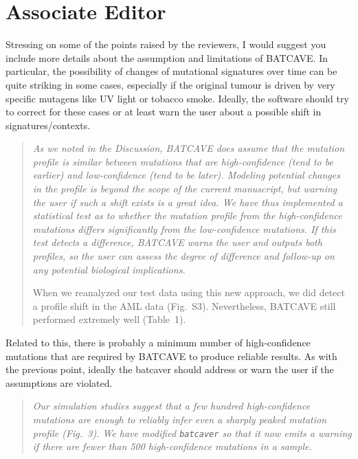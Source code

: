 \documentclass[11pt]{article}
\newenvironment{response}
{\begin{quote}\itshape}
{\end{quote}}
\begin{document}
\section*{Associate Editor}

Stressing on some of the points raised by the reviewers, I would suggest you include more details about the assumption and limitations of BATCAVE. In particular, the possibility of changes of mutational signatures over time can be quite striking in some cases, especially if the original tumour is driven by very specific mutagens like UV light or tobacco smoke. Ideally, the software should try to correct for these cases or at least warn the user about a possible shift in signatures/contexts.
\begin{response}
As we noted in the Discussion, BATCAVE does assume that the mutation profile is similar between mutations that are high-confidence (tend to be earlier) and low-confidence (tend to be later).
Modeling potential changes in the profile is beyond the scope of the current manuscript, but warning the user if such a shift exists is a great idea.
We have thus implemented a statistical test as to whether the mutation profile from the high-confidence mutations differs significantly from the low-confidence mutations.
If this test detects a difference, BATCAVE warns the user and outputs both profiles, so the user can assess the degree of difference and follow-up on any potential biological implications.

When we reanalyzed our test data using this new approach, we did detect a profile shift in the AML data (Fig.~S3).
Nevertheless, BATCAVE still performed extremely well (Table~1). 
\end{response}

Related to this, there is probably a minimum number of high-confidence mutations that are required by BATCAVE to produce reliable results. As with the previous point, ideally the batcaver should address or warn the user if the assumptions are violated.
\begin{response}
Our simulation studies suggest that a few hundred high-confidence mutations are enough to reliably infer even a sharply peaked mutation profile (Fig.~3).
We have modified \texttt{batcaver} so that it now emits a warning if there are fewer than 500 high-confidence mutations in a sample.
\end{response}
\end{document}
